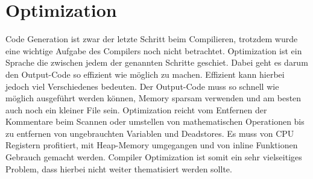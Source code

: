 \section{Optimization}
Code Generation ist zwar der letzte Schritt beim Compilieren, trotzdem wurde eine wichtige Aufgabe des Compilers noch nicht betrachtet. Optimization ist ein Sprache die zwischen jedem der genannten Schritte geschiet.
Dabei geht es darum den Output-Code so effizient wie möglich zu machen. Effizient kann hierbei jedoch viel Verschiedenes bedeuten. Der Output-Code muss so schnell wie möglich ausgeführt werden können, Memory sparsam verwenden
und am besten auch noch ein kleiner File sein. Optimization reicht vom Entfernen der Kommentare beim Scannen oder umstellen von mathematischen Operationen bis zu entfernen von ungebrauchten Variablen und Deadstores.
Es muss von CPU Registern profitiert, mit Heap-Memory umgegangen und von inline Funktionen Gebrauch gemacht werden. Compiler Optimization ist somit ein sehr vielseitiges Problem, dass hierbei nicht weiter thematisiert werden sollte.
